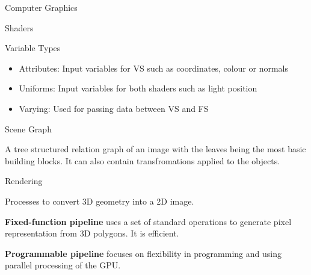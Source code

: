 \documentclass[12pt, letterpaper]{article}
\begin{document}
\begin{section}{Computer Graphics}
\begin{subsection}{Shaders}
    \begin{subsubsection}{Variable Types}

      \begin{itemize}
        \item Attributes: Input variables for VS such as coordinates, colour
              or normals
        \item Uniforms: Input variables for both shaders such as light position
        \item Varying: Used for passing data between VS and FS
      \end{itemize}

    \end{subsubsection}

  \end{subsection}

  \begin{subsection}{Scene Graph}

    A tree structured relation graph of an image with the leaves being the most
    basic building blocks. It can also contain transfromations applied to the
    objects.

  \end{subsection}

  \begin{subsection}{Rendering}

    Processes to convert 3D geometry into a 2D image.

    \textbf{Fixed-function pipeline} uses a set of standard operations to
    generate pixel representation from 3D polygons. It is efficient.

    \textbf{Programmable pipeline} focuses on flexibility in programming and
    using parallel processing of the GPU.

  \end{subsection}

\end{section}
\end{document}
